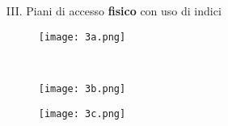 \begin{enumerate}
	\newpage
	\item[III.] Piani di accesso \textbf{fisico} con uso di indici
	\begin{figure}[!h]
		\centering
		\begin{minipage}{\textwidth}
			\centering
			\texttt{[image: 3a.png]}
		\end{minipage}\\
	\end{figure}
	\begin{figure}[!h]
		\centering
		\begin{minipage}{\textwidth}
			\centering
			\texttt{[image: 3b.png]}
		\end{minipage} \hspace{50pt}
		\begin{minipage}{\textwidth}
			\centering
			\texttt{[image: 3c.png]}
		\end{minipage}
	\end{figure}
\end{enumerate}